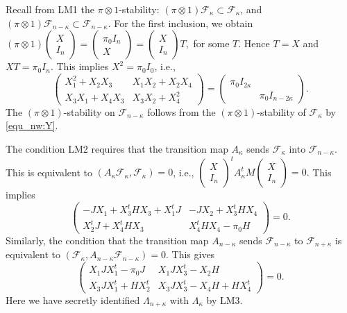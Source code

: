 \documentclass[pdflatex,sn-mathphys-num]{sn-jnl}%
\theoremstyle{thmstyleone}%
\theoremstyle{thmstyletwo}%
\numberwithin{equation}{subsection}
\theoremstyle{thmstylethree}%
\newcommand{\CF}{\ensuremath{\mathcal{F}}\xspace}
\begin{document}
		
Recall from {\selectfont LM1} the $\pi\otimes 1$-stability:
$(\pi\otimes 1)\CF_{\kappa}\subset\CF_{\kappa}$,
and
$(\pi\otimes 1)\CF_{n-\kappa}\subset\CF_{n-\kappa}$.
For the first inclusion, we obtain
$
(\pi\otimes 1) \left(\begin{matrix} X\\I_n \end{matrix}\right)
=\left(\begin{matrix} \pi_0 I_n\\X \end{matrix}\right)
=\left(\begin{matrix} X\\I_n \end{matrix}\right)T,	
$
for some $T$. Hence $T=X$ and $XT=\pi_0 I_n$. This implies $X^2=\pi_0 I_0$, i.e.,
\begin{equation*}
	\left(\begin{matrix}
		X_1^2+X_2X_3    &   X_1X_2+X_2X_4\\
		X_3X_1+X_4X_3   &   X_3X_2+X_4^2
		\end{matrix}\right)
	=
	\left(\begin{matrix}
		\pi_0 I_{2\kappa}    &   \\
		&\pi_0 I_{n-2\kappa}
	\end{matrix}\right).	
\end{equation*}
	The $(\pi\otimes 1)$-stability on $\CF_{n-\kappa}$ follows from the $(\pi\otimes 1)$-stability of $\CF_{\kappa}$ by \eqref{equ_nw:Y}.
			
The condition {\selectfont LM2} requires that the transition map $A_\kappa$ sends $\CF_\kappa$ into $\CF_{n-\kappa}$. This is equivalent to $(A_\kappa \CF_\kappa,\CF_\kappa)=0$, i.e., $\left(\begin{matrix} X\\I_n \end{matrix}\right)^t A_{\kappa}^t M \left(\begin{matrix} X\\I_n \end{matrix}\right)=0.$
This implies
\begin{equation*}
	\left(\begin{matrix}
		-JX_1+X_3^t H X_3 + X_1^t J    &   -J X_2+X_3^t H X_4\\
		X_2^t J+X_4^t H X_3  &   X_4^t H X_4 -\pi_0 H
	\end{matrix}\right)
	=0.
\end{equation*}
Similarly, the condition that the transition map $A_{n-\kappa}$ sends $\CF_{n-\kappa}$ to $\CF_{n+\kappa}$ is equivalent to $(\CF_\kappa,A_{n-\kappa} \CF_{n-\kappa})=0$. This gives 
\begin{equation*}
	\left(\begin{matrix}
		X_1 J X_1^t -\pi_0 J  &   X_1 J X_3^t-X_2 H\\
		X_3 J X_1^t + HX_2^t    &   X_3 JX_3^t-X_4 H+HX_4^t
	\end{matrix}\right)=0.	
\end{equation*}
Here we have secretly identified $\Lambda_{n+\kappa}$ with $\Lambda_\kappa$ by {\selectfont LM3}.
\end{document}
